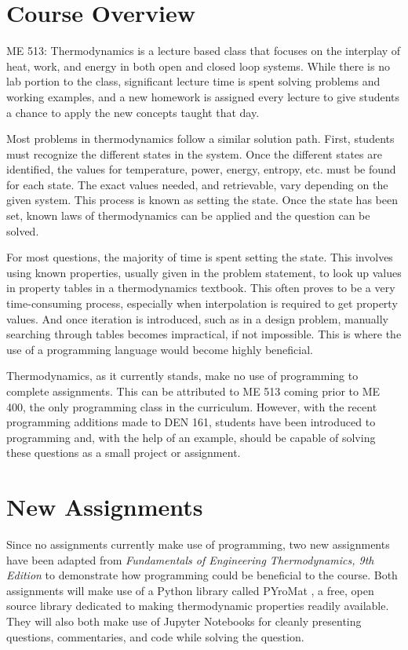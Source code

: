 \section{Course Overview}

ME 513: Thermodynamics is a lecture based class that focuses on the interplay of heat, work, and energy in both
open and closed loop systems. While there is no lab portion to the class, significant lecture time is spent
solving problems and working examples, and a new homework is assigned every lecture to give students a chance
to apply the new concepts taught that day.

Most problems in thermodynamics follow a similar solution path. First, students must recognize the different
states in the system. Once the different states are identified, the values for temperature, power, energy,
entropy, etc. must be found for each state. The exact values needed, and retrievable, vary depending on the
given system. This process is known as setting the state. Once the state has been set, known laws of
thermodynamics can be applied and the question can be solved.

For most questions, the majority of time is spent setting the state. This involves using known properties, 
usually given in the problem statement, to look up values in property tables in a thermodynamics textbook. 
This often proves to be a very time-consuming process, especially when interpolation is required to get 
property values. And once iteration is introduced, such as in a design problem, manually searching through
tables becomes impractical, if not impossible. This is where the use of a programming language would become 
highly beneficial.

Thermodynamics, as it currently stands, make no use of programming to complete assignments.
This can be attributed to ME 513 coming prior to ME 400, the only programming class in the 
curriculum. However, with the recent programming additions made to DEN 161, students have been introduced
to programming and, with the help of an example, should be capable of solving these questions as a small
project or assignment.

\section{New Assignments}

Since no assignments currently make use of programming, two new assignments have been adapted from 
\textit{Fundamentals of Engineering Thermodynamics, 9th Edition} \cite{thermodynamics} to demonstrate
how programming could be beneficial to the course. Both assignments will make use of a Python library called
PYroMat \cite{chris_martin_2022_7262173}, a free, open source library dedicated to making thermodynamic properties 
readily available. They will also both make use of Jupyter Notebooks for cleanly presenting questions, 
commentaries, and code while solving the question.

